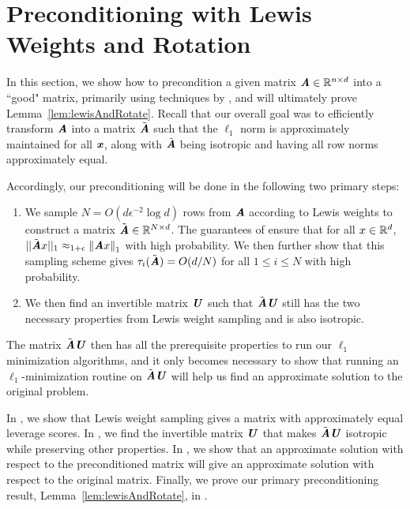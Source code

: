 \section{Preconditioning with Lewis Weights and Rotation}\label{sec:lewis}

In this section, we show how to precondition a given matrix $\AA \in \R^{n \times d}$ into a ``good" matrix, primarily
using techniques by \cite{cohenpeng}, and will ultimately prove Lemma~\ref{lem:lewisAndRotate}.
Recall that our overall goal was to efficiently transform $\AA$ into a matrix $\tilde{\AA}$ such that the $\ell_1$ norm is approximately maintained for all $\xx$, along with $\tilde{\AA}$ being isotropic and having all row norms approximately equal. 

Accordingly, our preconditioning will be done in the following two primary steps:
\begin{enumerate}
	\item We sample $N = O(d \epsilon^{-2} \log d )$ rows from $\AA$ according to Lewis weights \citep{cohenpeng}
	to construct a matrix $\tilde{\AA} \in \R^{N \times d}$. The guarantees of \cite{cohenpeng} ensure that
	for all $x \in \R^d$, $||\tilde{\AA} x||_1 \approx_{1+\epsilon} \norm{\AA x}_1$ with high probability. We then further show that this sampling scheme gives $\tau_i (\tilde{\AA}) = O(d/N)$ for all $1 \leq i \leq N$ with high probability.
	\item We then find an invertible matrix $\UU$ such that $\tilde{\AA}\UU$ still has the two necessary properties from Lewis weight sampling and is also isotropic.
\end{enumerate}

The matrix $\tilde{\AA}\UU$ then has all the prerequisite properties
to run our $\ell_1$ minimization algorithms, and it only becomes necessary to show that running an $\ell_1$-minimization routine on $\tilde{\AA}\UU$
will help us find an approximate solution to the original problem.

In , we show that Lewis weight sampling gives a matrix with approximately equal leverage scores.
In , we find the invertible matrix $\UU$ that makes $\tilde{\AA}\UU$ isotropic while preserving other properties.
In , we show that an approximate solution with respect to the preconditioned matrix will give an approximate solution with respect to the original matrix.
Finally, we prove our primary preconditioning result, Lemma~\ref{lem:lewisAndRotate}, in .

